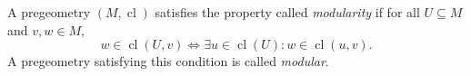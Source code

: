 A pregeometry $(M, \operatorname{cl})$ satisfies the property called \emph{modularity} if for all $U \subseteq M$ and $v, w \in M$,
$$w \in \operatorname{cl}(U, v) \iff \exists u \in \operatorname{cl}(U) : w \in \operatorname{cl}(u, v).$$
A pregeometry satisfying this condition is called \emph{modular}.
